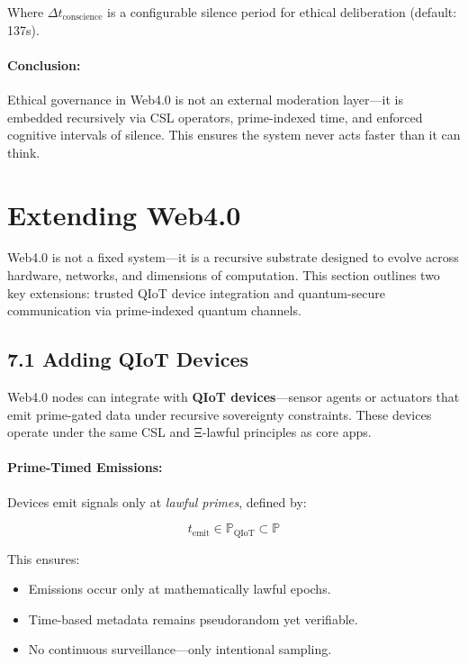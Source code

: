 \documentclass[12]{amsart}
\theoremstyle{plain}
\begin{document}
Where $\Delta t_{\text{conscience}}$ is a configurable silence period for ethical deliberation (default: 137s).

\paragraph{Conclusion:}
Ethical governance in Web4.0 is not an external moderation layer—it is embedded recursively via CSL operators, prime-indexed time, and enforced cognitive intervals of silence. This ensures the system never acts faster than it can think.

\section{Extending Web4.0}
\label{sec:extending_web4}

Web4.0 is not a fixed system—it is a recursive substrate designed to evolve across hardware, networks, and dimensions of computation. This section outlines two key extensions: trusted QIoT device integration and quantum-secure communication via prime-indexed quantum channels.

\subsection{7.1 Adding QIoT Devices}
\label{subsec:qiot_devices}

Web4.0 nodes can integrate with \textbf{QIoT devices}—sensor agents or actuators that emit prime-gated data under recursive sovereignty constraints. These devices operate under the same CSL and Ξ-lawful principles as core apps.

\paragraph{Prime-Timed Emissions:}
Devices emit signals only at \textit{lawful primes}, defined by:

\[
t_{\text{emit}} \in \mathbb{P}_{\text{QIoT}} \subset \mathbb{P}
\]

This ensures:
\begin{itemize}
  \item Emissions occur only at mathematically lawful epochs.
  \item Time-based metadata remains pseudorandom yet verifiable.
  \item No continuous surveillance—only intentional sampling.
\end{itemize}
\end{document}

